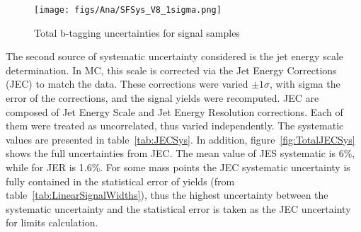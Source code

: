 \begin{figure}[!Hhtbp]
  \begin{center}
    \texttt{[image: figs/Ana/SFSys\_V8\_1sigma.png]}
    \caption{Total b-tagging uncertainties for signal samples}
    \label{fig:TotalSFSys}
  \end{center}
\end{figure}

The second source of systematic uncertainty considered is the jet energy scale determination. In MC, this scale is corrected via the Jet Energy Corrections (JEC) to match the data. These corrections were varied $\pm 1\sigma$, with sigma the error of the corrections, and the signal yields were recomputed. JEC are composed of Jet Energy Scale and Jet Energy Resolution corrections. Each of them were treated as uncorrelated, thus varied independently. The systematic values are presented in table~\ref{tab:JECSys}. In addition, figure~\ref{fig:TotalJECSys} shows the full uncertainties from JEC. The mean value of JES systematic is 6\%, while for JER is 1.6\%. For some mass points the JEC systematic uncertainty is fully contained in the statistical error of yields (from table~\ref{tab:LinearSignalWidths}), thus the highest uncertainty between the systematic uncertainty and the statistical error is taken as the JEC uncertainty for limits calculation.

\begin{table*}[htbH]
\begin{center}
\caption{JEC uncertainties for signal samples\label{tab:JECSys}}
\end{center}
\end{table*}

